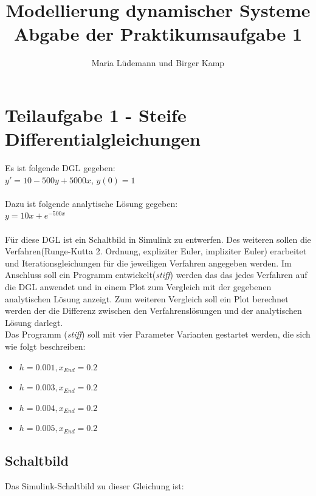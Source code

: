 \documentclass[]{scrartcl}
\title{Modellierung dynamischer Systeme  \\ Abgabe der Praktikumsaufgabe 1}
\author{Maria Lüdemann und Birger Kamp}
\begin{document}
\maketitle

\begin{abstract}

\end{abstract}

\section{Teilaufgabe 1 - Steife Differentialgleichungen}
Es ist folgende DGL gegeben:\\
$ y' = 10 - 500y + 5000x $,
$ y(0) = 1 $\\
\\
Dazu ist folgende analytische Lösung gegeben:\\
$ y = 10x + e^{-500x}$ \\
\\
Für diese DGL ist ein Schaltbild in Simulink zu entwerfen. Des weiteren sollen die Verfahren(Runge-Kutta 2. Ordnung, expliziter Euler, impliziter Euler) erarbeitet und Iterationsgleichungen für die jeweiligen Verfahren angegeben werden. Im Anschluss soll ein Programm entwickelt(\textit{stiff}) werden das das jedes Verfahren auf die DGL anwendet und in einem Plot zum Vergleich mit der gegebenen analytischen Lösung anzeigt. Zum weiteren Vergleich soll ein Plot berechnet werden der die Differenz zwischen den Verfahrenslösungen und der analytischen Lösung darlegt.\\
Das Programm (\textit{stiff}) soll mit vier Parameter Varianten gestartet werden, die sich wie folgt beschreiben:
\begin{itemize}
	\item $h = 0.001,  x_{End} = 0.2 $
	\item $h = 0.003,  x_{End} = 0.2 $
	\item $h = 0.004,  x_{End} = 0.2 $
	\item $h = 0.005,  x_{End} = 0.2 $
\end{itemize}

\subsection*{Schaltbild}
Das Simulink-Schaltbild zu dieser Gleichung ist:
\end{document}
